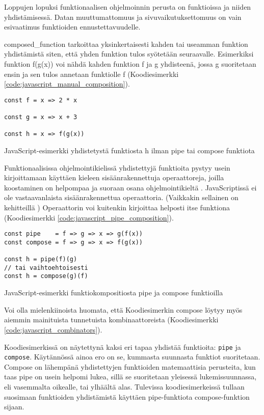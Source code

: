 Loppujen lopuksi funktionaalisen ohjelmoinnin perusta on funktioissa ja niiden yhdistämisessä. Datan muuttumattomuus ja sivuvaikutuksettomuus on vain esivaatimus funktioiden ennustettavuudelle.

\Gls{composed_function} tarkoittaa yksinkertaisesti kahden tai useamman funktion yhdistämistä siten, että yhden funktion tulos syötetään seuraavalle. Esimerkiksi funktion f(g(x)) voi nähdä kahden funktion f ja g yhdisteenä, jossa g suoritetaan ensin ja sen tulos annetaan funktiolle f (Koodiesimerkki \ref{code:javascript_manual_composition}).

\begin{code}
	\begin{verbatim}
const f = x => 2 * x

const g = x => x + 3

const h = x => f(g(x))
\end{verbatim}
	\caption{JavaScript-esimerkki yhdistetystä funktiosta h ilman pipe tai compose funktiota}
	\label{code:javascript_manual_composition}
\end{code}

Funktionaalisissa ohjelmointikielissä yhdistettyjä funktioita pystyy usein kirjoittamaan käyttäen kieleen sisäänrakennettuja operaattoreja, joilla koostaminen on helpompaa ja suoraan osana ohjelmointikieltä \cite{fsharpcomposition,haskellcomposition}.
JavaScriptissä ei ole vastaavanlaista sisäänrakennettua operaattoria.
(Vaikkakin sellainen on kehitteillä \cite{tc39_pipeline_operator})
Operaattorin voi kuitenkin kirjoittaa helposti itse funktiona (Koodiesimerkki \ref{code:javascript_pipe_composition}).

\begin{code}
	\begin{verbatim}
const pipe    = f => g => x => g(f(x))
const compose = f => g => x => f(g(x))

const h = pipe(f)(g)
// tai vaihtoehtoisesti
const h = compose(g)(f)
\end{verbatim}
	\caption{JavaScript-esimerkki funktiokompositiosta pipe ja compose funktioilla}
	\label{code:javascript_pipe_composition}
\end{code}

Voi olla mielenkiinoista huomata, että Koodiesimerkin compose löytyy myös aiemmin mainituista tunnetuista kombinaattoreista (Koodiesimerkki \ref{code:javascript_combinators}).

Koodiesimerkissä on näytettynä kaksi eri tapaa yhdistää funktioita: \texttt{pipe} ja \texttt{compose}. Käytännössä ainoa ero on se, kummasta suunnasta funktiot suoritetaan. Compose on lähempänä yhdistettyjen funktioiden matemaattisia perusteita, kun taas pipe on usein helpomi lukea, sillä se suoritetaan yleisessä lukemissuunnassa, eli vasemmalta oikealle, tai ylhäältä alas. Tulevissa koodiesimerkeissä tullaan suosimaan funktioiden yhdistämistä käyttäen pipe-funktiota compose-funktion sijaan. \citep{whyprefercompose}

